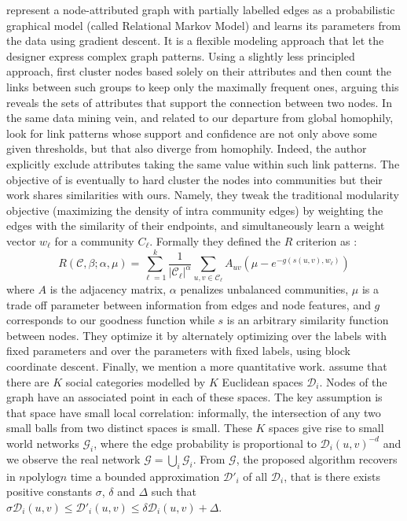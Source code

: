 \Textcite{Taskar04} represent a node-attributed graph with partially labelled edges as a
probabilistic graphical model (called Relational Markov Model) and learns its parameters from the
data using gradient descent. It is a flexible modeling approach that let the designer express
complex graph patterns. Using a slightly less principled approach, \textcite{conceptualLinks12}
first cluster nodes based solely on their attributes and then count the links between such groups to
keep only the maximally frequent ones, arguing this reveals the sets of attributes that support the
connection between two nodes. In the same data mining vein, and related to our departure from global
homophily, \textcite{beyondHome16} look for link patterns whose support and confidence are not only
above some given thresholds, but that also diverge from homophily. Indeed, the author explicitly exclude
attributes taking the same value within such link patterns.
The objective of \textcite{ZhangModelFree16} is eventually to hard cluster the nodes into
communities but their work shares similarities with ours. Namely, they tweak the traditional modularity
objective (maximizing the density of intra community edges) by weighting the edges with the
similarity of their endpoints, and simultaneously learn a weight vector $w_\ell$ for a community
$C_\ell$. Formally they defined the $R$ criterion as :
\begin{equation*}
  R(\mathcal{C}, \beta;\alpha, \mu) = \sum_{\ell=1}^k \frac{1}{|\mathcal{C}_\ell|^\alpha}
  \sum_{u,v \in \mathcal{C}_\ell} A_{uv} \left( \mu -e^{-g(s(u,v), w_\ell)} \right)
\end{equation*}
where $A$ is the adjacency matrix, $\alpha$ penalizes unbalanced communities, $\mu$ is a trade off
parameter between information from edges and node features, and $g$ corresponds to our goodness
function while $s$ is an arbitrary similarity function between nodes.
They optimize it by alternately optimizing over the labels with fixed parameters and over
the parameters with fixed labels, using block coordinate descent.
Finally, we mention a more quantitative work. \Textcite{Abraham2012a} assume that there are $K$
social categories modelled by $K$ Euclidean spaces $\mathcal{D}_i$. Nodes of the graph have an
associated point in each of these spaces. The key assumption is that space have small local
correlation: informally, the intersection of any two small balls from two distinct spaces is small.
These $K$ spaces give rise to small world networks $\mathcal{G}_i$, where the edge probability
is proportional to $\mathcal{D}_i(u, v)^{-d}$ and we observe the real network $\mathcal{G} =\bigcup_i
\mathcal{G}_i$. From $\mathcal{G}$, the proposed algorithm recovers in $n \mathrm{polylog} n$ time a
bounded approximation $\mathcal{D}'_i$ of all $\mathcal{D}_i$, that is there exists positive
constants $\sigma$, $\delta$ and $\Delta$ such that $
\sigma \mathcal{D}_i(u, v) \leq \mathcal{D}'_i(u, v) \leq \delta \mathcal{D}_i(u, v) + \Delta$.

